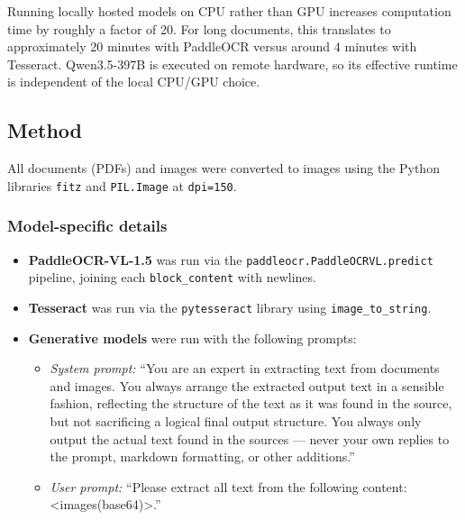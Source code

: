 \documentclass[11pt,a4paper]{article}
\begin{document}
Running locally hosted models on CPU rather than GPU increases computation time by roughly a factor of 20. For long documents, this translates to approximately 20 minutes with PaddleOCR versus around 4 minutes with Tesseract. Qwen3.5-397B is executed on remote hardware, so its effective runtime is independent of the local CPU/GPU choice.

\subsection{Method}

All documents (PDFs) and images were converted to images using the Python libraries \texttt{fitz} and \texttt{PIL.Image} at \texttt{dpi=150}.

\subsubsection{Model-specific details}

\begin{itemize}[leftmargin=*, itemsep=2pt]
  \item \textbf{PaddleOCR-VL-1.5} was run via the \texttt{paddleocr.PaddleOCRVL.predict} pipeline, joining each \texttt{block\_content} with newlines.
  \item \textbf{Tesseract} was run via the \texttt{pytesseract} library using \texttt{image\_to\_string}.
  \item \textbf{Generative models} were run with the following prompts:
  \begin{itemize}[leftmargin=*, itemsep=2pt]
    \item \emph{System prompt:} ``You are an expert in extracting text from documents and images. You always arrange the extracted output text in a sensible fashion, reflecting the structure of the text as it was found in the source, but not sacrificing a logical final output structure. You always only output the actual text found in the sources --- never your own replies to the prompt, markdown formatting, or other additions.''
    \item \emph{User prompt:} ``Please extract all text from the following content: \textless images(base64)\textgreater.''
  \end{itemize}
\end{itemize}
\end{document}
